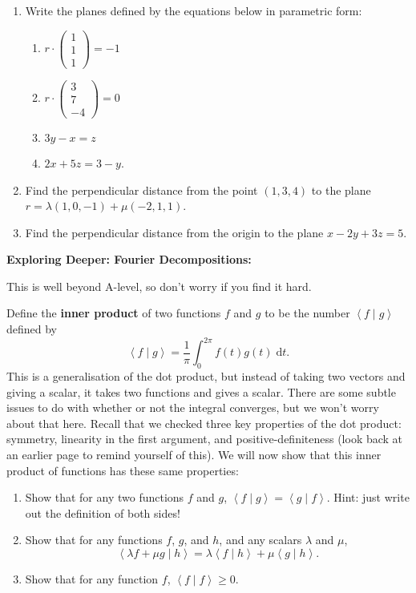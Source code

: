 \documentclass{article}
\newcommand{\diff}{\;\mathrm{d}}
\newcommand{\braket}[2]{\left\langle #1 \mid #2 \right\rangle}
\begin{document}
\begin{enumerate}
	\item Write the planes defined by the equations below in parametric form:
		\begin{enumerate}
			\item $r\cdot\left(\begin{array}{c} 1\\1\\1\end{array}\right)=-1$
			\item $r\cdot\left(\begin{array}{c} 3\\7\\-4\end{array}\right)=0$
			\item $3y-x=z$
			\item $2x+5z=3-y$.
		\end{enumerate}
	\item Find the perpendicular distance from the point $(1,3,4)$ to the plane $r=\lambda(1,0,-1)+\mu(-2,1,1)$.
	\item Find the perpendicular distance from the origin to the plane $x-2y+3z=5$.
\end{enumerate}

\clearpage




\textbf{Exploring Deeper: Fourier Decompositions:}\bigskip


This is well beyond A-level, so don't worry if you find it hard.

Define the \textbf{inner product} of two functions $f$ and $g$ to be the number $\braket{f}{g}$ defined by
\[\braket{f}{g}=\frac{1}{\pi}\int_0^{2\pi}f(t)g(t)\diff t.\]
This is a generalisation of the dot product, but instead of taking two vectors and giving a scalar, it takes two functions and gives a scalar. There are some subtle issues to do with whether or not the integral converges, but we won't worry about that here. Recall that we checked three key properties of the dot product: symmetry, linearity in the first argument, and positive-definiteness (look back at an earlier page to remind yourself of this). We will now show that this inner product of functions has these same properties:

\begin{enumerate}
	\item Show that for any two functions $f$ and $g$, $\braket{f}{g}=\braket{g}{f}$. Hint: just write out the definition of both sides!
	\item Show that for any functions $f$, $g$, and $h$, and any scalars $\lambda$ and $\mu$,
		\[\braket{\lambda f + \mu g}{h}=\lambda \braket{f}{h}+\mu \braket{g}{h}.\]
	\item Show that for any function $f$, $\braket{f}{f}\geq 0$.
\end{enumerate}
\end{document}
